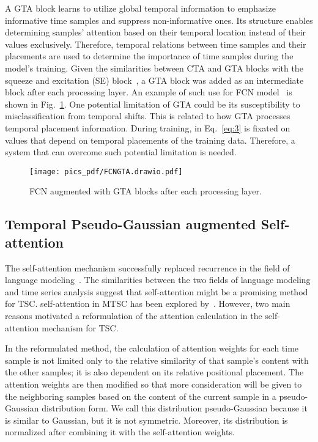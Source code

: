 \documentclass[journal]{IEEEtran}
\begin{document}
A GTA block learns to utilize global temporal information to emphasize informative time samples and suppress non-informative ones. Its structure enables determining samples' attention based on their temporal location instead of their values exclusively. Therefore, temporal relations between time samples and their placements are used to determine the importance of time samples during the model's training. Given the similarities between CTA and GTA blocks with the squeeze and excitation (SE) block~\cite{hu2018squeeze}, a GTA block was added as an intermediate block after each processing layer. An example of such use for FCN model~\cite{wang2017time} is shown in Fig.~\ref{fig:fcngta}. One potential limitation of GTA could be its susceptibility to misclassification from temporal shifts. This is related to how GTA processes temporal placement information. During training,  in Eq.~\eqref{eq:3} is fixated on values that depend on temporal placements of the training data. Therefore, a system that can overcome such potential limitation is needed.
\begin{figure}[!t]
\centering
\texttt{[image: pics\_pdf/FCNGTA.drawio.pdf]}
\caption{FCN augmented with GTA blocks after each processing layer. }
\label{fig:fcngta}
\end{figure}
\subsection{Temporal Pseudo-Gaussian augmented Self-attention}
The self-attention mechanism successfully replaced recurrence in the field of language modeling~\cite{vaswani2017attention}. The similarities between the two fields of language modeling and time series analysis suggest that self-attention might be a promising method for TSC. self-attention in MTSC has been explored by~\cite{liu2021gated, zerveas2020transformer}. However, two main reasons motivated a reformulation of the attention calculation in the self-attention mechanism for TSC. 

In the reformulated method, the calculation of attention weights for each time sample is not limited only to the relative similarity of that sample's content with the other samples; it is also dependent on its relative positional placement. The attention weights are then modified so that more consideration will be given to the neighboring samples based on the content of the current sample in a pseudo-Gaussian distribution form. We call this distribution pseudo-Gaussian because it is similar to Gaussian, but it is not symmetric. Moreover, its distribution is normalized after combining it with the self-attention weights.
\end{document}

